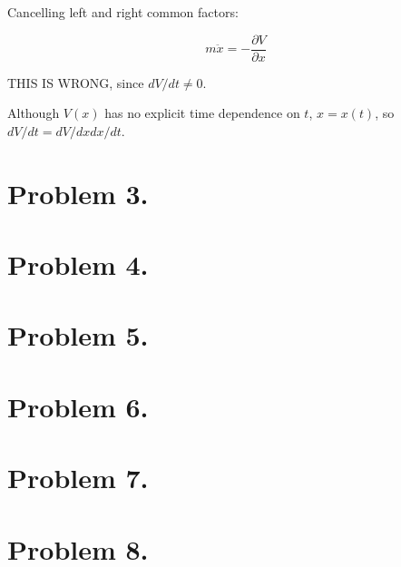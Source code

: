 \documentclass{article}
\newcommand{\xddot}[0]{\ddot{x}}
\begin{document}
Cancelling left and right common factors:

\begin{equation*}
m \xddot = -\frac{\partial V}{\partial x}
\end{equation*}

THIS IS WRONG, since $dV/dt \ne 0$.

Although $V(x)$ has no explicit time
dependence on $t$, $x = x(t)$, so $dV/dt = dV/dx dx/dt$.

\section{ Problem 3. }
\section{ Problem 4. }
\section{ Problem 5. }
\section{ Problem 6. }
\section{ Problem 7. }
\section{ Problem 8. }
\end{document}
